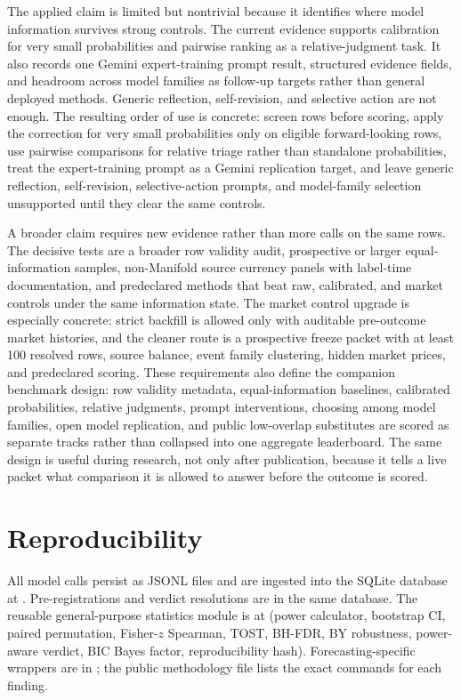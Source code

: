 \documentclass[11pt]{article}
\begin{document}
The applied claim is limited but nontrivial because it identifies where model information survives strong controls. The current evidence supports calibration for very small probabilities and pairwise ranking as a relative-judgment task. It also records one Gemini expert-training prompt result, structured evidence fields, and headroom across model families as follow-up targets rather than general deployed methods. Generic reflection, self-revision, and selective action are not enough. The resulting order of use is concrete: screen rows before scoring, apply the correction for very small probabilities only on eligible forward-looking rows, use pairwise comparisons for relative triage rather than standalone probabilities, treat the expert-training prompt as a Gemini replication target, and leave generic reflection, self-revision, selective-action prompts, and model-family selection unsupported until they clear the same controls.

A broader claim requires new evidence rather than more calls on the same rows. The decisive tests are a broader row validity audit, prospective or larger equal-information samples, non-Manifold source currency panels with label-time documentation, and predeclared methods that beat raw, calibrated, and market controls under the same information state. The market control upgrade is especially concrete: strict backfill is allowed only with auditable pre-outcome market histories, and the cleaner route is a prospective freeze packet with at least 100 resolved rows, source balance, event family clustering, hidden market prices, and predeclared scoring. These requirements also define the companion benchmark design: row validity metadata, equal-information baselines, calibrated probabilities, relative judgments, prompt interventions, choosing among model families, open model replication, and public low-overlap substitutes are scored as separate tracks rather than collapsed into one aggregate leaderboard. The same design is useful during research, not only after publication, because it tells a live packet what comparison it is allowed to answer before the outcome is scored.

\section{Reproducibility}
\label{sec:repro}

All model calls persist as JSONL files and are ingested into the SQLite database at . Pre-registrations and verdict resolutions are in the same database. The reusable general-purpose statistics module is at  (power calculator, bootstrap CI, paired permutation, Fisher-$z$ Spearman, TOST, BH-FDR, BY robustness, power-aware verdict, BIC Bayes factor, reproducibility hash). Forecasting-specific wrappers are in ; the public methodology file lists the exact commands for each finding.
\end{document}
